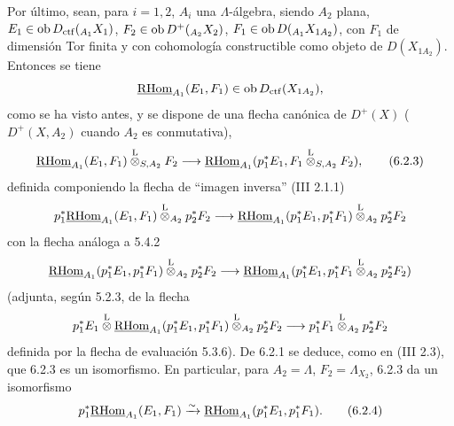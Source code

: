 Por último, sean, para $i=1,2$, $A_i$ una $\Lambda$-álgebra, siendo $A_2$ plana, $E_1\in\operatorname{ob} D_{\mathrm{ctf}}({}_{A_1}X_1)$, $F_2\in\operatorname{ob} D^+({}_{A_2}X_2)$, $F_1\in\operatorname{ob} D({}_{A_1}X_{1A_2})$, con $F_1$ de dimensión Tor finita y con cohomología constructible como objeto de $D(X_{1A_2})$. Entonces se tiene
\[
\underline{\mathrm{RHom}}_{A_1}(E_1,F_1)\in\operatorname{ob} D_{\mathrm{ctf}}(X_{1A_2}),
\]
como se ha visto antes, y se dispone de una flecha canónica de $D^+(X)$ ($D^+(X,A_2)$ cuando $A_2$ es conmutativa),
\begin{equation}
\underline{\mathrm{RHom}}_{A_1}(E_1,F_1)\overset{\mathrm L}{\otimes}_{S,A_2}F_2
\longrightarrow
\underline{\mathrm{RHom}}_{A_1}(p_1^*E_1,F_1\overset{\mathrm L}{\otimes}_{S,A_2}F_2),
\tag{6.2.3}
\end{equation}
definida componiendo la flecha de ``imagen inversa'' (III 2.1.1)
\[
p_1^*\underline{\mathrm{RHom}}_{A_1}(E_1,F_1)\overset{\mathrm L}{\otimes}_{A_2}p_2^*F_2
\longrightarrow
\underline{\mathrm{RHom}}_{A_1}(p_1^*E_1,p_1^*F_1)\overset{\mathrm L}{\otimes}_{A_2}p_2^*F_2
\]
con la flecha análoga a 5.4.2
\[
\underline{\mathrm{RHom}}_{A_1}(p_1^*E_1,p_1^*F_1)\overset{\mathrm L}{\otimes}_{A_2}p_2^*F_2
\longrightarrow
\underline{\mathrm{RHom}}_{A_1}(p_1^*E_1,p_1^*F_1\overset{\mathrm L}{\otimes}_{A_2}p_2^*F_2)
\]
(adjunta, según 5.2.3, de la flecha
\[
p_1^*E_1\overset{\mathrm L}{\otimes}\underline{\mathrm{RHom}}_{A_1}(p_1^*E_1,p_1^*F_1)\overset{\mathrm L}{\otimes}_{A_2}p_2^*F_2
\longrightarrow
p_1^*F_1\overset{\mathrm L}{\otimes}_{A_2}p_2^*F_2
\]
definida por la flecha de evaluación 5.3.6). De 6.2.1 se deduce, como en (III 2.3), que 6.2.3 es un isomorfismo. En particular, para $A_2=\Lambda$, $F_2=\Lambda_{X_2}$, 6.2.3 da un isomorfismo
\begin{equation}
p_1^*\underline{\mathrm{RHom}}_{A_1}(E_1,F_1)
\xrightarrow{\sim}
\underline{\mathrm{RHom}}_{A_1}(p_1^*E_1,p_1^*F_1).
\tag{6.2.4}
\end{equation}
